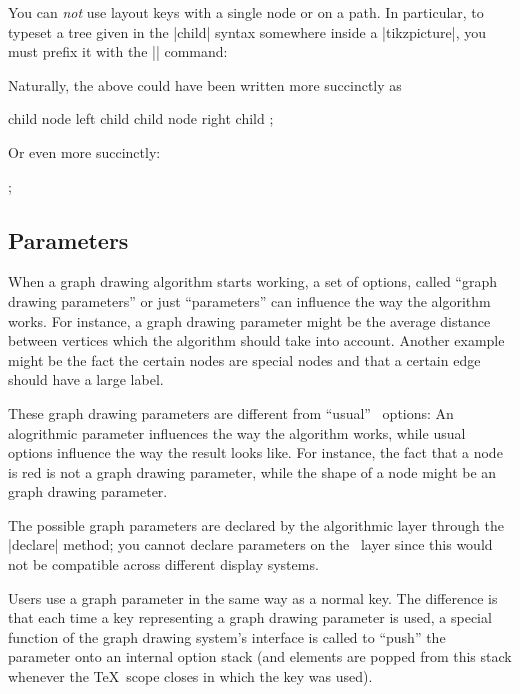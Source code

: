 \begin{command}{\pgfgdsetrequestcallback{}}
  You can \emph{not} use layout keys with a single
  node or on a path. In particular, to typeset a tree given in the
  |child| syntax somewhere inside a |{tikzpicture}|, you must prefix
  it with the |\scoped| command:
\begin{codeexample}[]
\end{codeexample}
  Naturally, the above could have been written more succinctly as
\begin{codeexample}[]
  child { node {left child} }
  child { node {right child} };
\end{codeexample}
  Or even more succinctly:
\begin{codeexample}[]
\tikz {};
\end{codeexample}
\end{command}



\subsection{Parameters}
\label{section-gd-parameters}

When a graph drawing algorithm starts working, a set of options,
called ``graph drawing parameters'' or just ``parameters'' can influence
the way the algorithm works. For instance, a graph drawing parameter
might be the average distance between vertices which the algorithm
should take into account. Another example might be the fact the
certain nodes are special nodes and that a certain edge should have
a large label.

These graph drawing parameters are different from ``usual'' \pgfname\
options: An alogrithmic parameter influences the way the algorithm
works, while usual options influence the way the result
looks like. For instance, the fact that a node is red is not a
graph drawing parameter, while the shape of a node might be an graph
drawing parameter. 

The possible graph parameters are declared by the algorithmic layer
through the |declare| method; you cannot declare parameters on the
\pgfname\ layer since this would not be compatible across different
display systems.

Users use a graph parameter in the same way as a normal key. The
difference is that each time a key representing a graph drawing
parameter is used, a special function of the graph drawing system's
interface is called to ``push'' the parameter onto an internal option
stack (and elements are popped from this stack whenever the \TeX\
scope closes in which the key was used).

